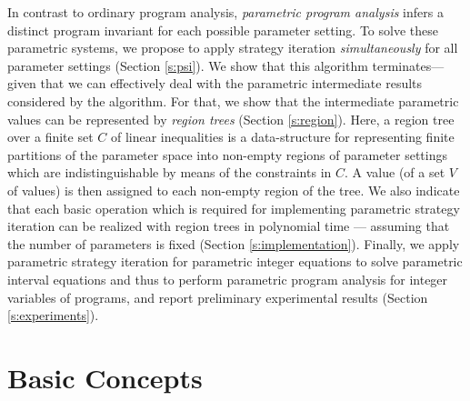 \documentclass[a4paper]{easychair}
\begin{document}
In contrast to ordinary program analysis,
\emph{parametric program analysis} infers a distinct program invariant 
for each possible parameter setting.
To solve these parametric systems,
we propose to apply strategy iteration \emph{simultaneously} for all parameter settings 
(Section \ref{s:psi}).
We show that this algorithm terminates---given that we can effectively deal
with the parametric intermediate results considered by the algorithm.
For that, we show that
the intermediate parametric values can be represented 
by \emph{region trees} (Section \ref{s:region}).
Here, a region tree over a finite set $C$ of linear inequalities is a data-structure
for representing finite partitions of the parameter space into non-empty regions of parameter settings which
are indistinguishable by means of the constraints in $C$. 
A value (of a set $V$ of values) is then assigned to each non-empty region of the tree. We also indicate that
each basic operation which is required for implementing parametric strategy iteration 
can be realized with region trees in polynomial time --- assuming that the number of parameters is fixed
(Section \ref{s:implementation}).
Finally, we apply parametric strategy iteration for parametric integer equations
to solve parametric interval equations and thus to perform
parametric program analysis
for integer variables of programs, and report preliminary experimental results 
(Section \ref{s:experiments}).


\section{Basic Concepts}\label{s:basics}
\end{document}
